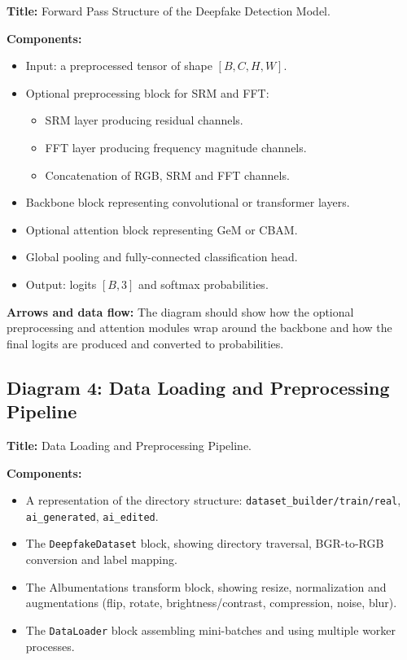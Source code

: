 \textbf{Title:} Forward Pass Structure of the Deepfake Detection Model.

\textbf{Components:}
\begin{itemize}
  \item Input: a preprocessed tensor of shape $[B, C, H, W]$.
  \item Optional preprocessing block for SRM and FFT:
  \begin{itemize}
    \item SRM layer producing residual channels.
    \item FFT layer producing frequency magnitude channels.
    \item Concatenation of RGB, SRM and FFT channels.
  \end{itemize}
  \item Backbone block representing convolutional or transformer layers.
  \item Optional attention block representing GeM or CBAM.
  \item Global pooling and fully-connected classification head.
  \item Output: logits $[B, 3]$ and softmax probabilities.
\end{itemize}

\textbf{Arrows and data flow:} The diagram should show how the optional preprocessing and attention modules wrap around the backbone and how the final logits are produced and converted to probabilities.

\subsection*{Diagram 4: Data Loading and Preprocessing Pipeline}

\textbf{Title:} Data Loading and Preprocessing Pipeline.

\textbf{Components:}
\begin{itemize}
  \item A representation of the directory structure: \texttt{dataset\_builder/train/real}, \texttt{ai\_generated}, \texttt{ai\_edited}.
  \item The \texttt{DeepfakeDataset} block, showing directory traversal, BGR-to-RGB conversion and label mapping.
  \item The Albumentations transform block, showing resize, normalization and augmentations (flip, rotate, brightness/contrast, compression, noise, blur).
  \item The \texttt{DataLoader} block assembling mini-batches and using multiple worker processes.
\end{itemize}

